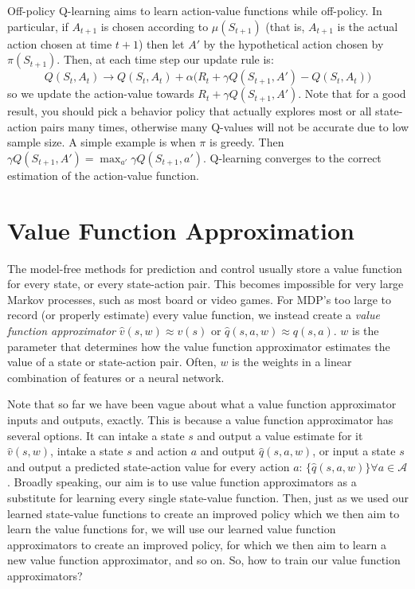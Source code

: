 \documentclass{article}
\newcommand{\ita}{\textit}
\begin{document}
Off-policy Q-learning aims to learn action-value functions while off-policy. In particular, if $A_{t+1}$ is chosen according to $\mu(S_{t+1})$ (that is, $A_{t+1}$ is the actual action chosen at time $t+1$) then let $A'$ by the hypothetical action chosen by $\pi(S_{t+1})$. Then, at each time step our update rule is:
$$Q(S_t, A_t) \rightarrow Q(S_t, A_t) + \alpha\bigg(R_t + \gamma Q(S_{t+1}, A') - Q(S_t, A_t)\bigg)$$
so we update the action-value towards $R_t + \gamma Q(S_{t+1}, A')$. Note that for a good result, you should pick a behavior policy that actually explores most or all state-action pairs many times, otherwise many Q-values will not be accurate due to low sample size. A simple example is when $\pi$ is greedy. Then $\gamma Q(S_{t+1}, A') = \max_{a'} \gamma Q(S_{t+1}, a')$. Q-learning converges to the correct estimation of the action-value function.

\section{Value Function Approximation}

The model-free methods for prediction and control usually store a value function for every state, or every state-action pair. This becomes impossible for very large Markov processes, such as most board or video games. For MDP's too large to record (or properly estimate) every value function, we instead create a \ita{value function approximator} $\hat{v}(s, w)\approx v(s)$ or $\hat{q}(s, a, w) \approx q(s, a)$. $w$ is the parameter that determines how the value function approximator estimates the value of a state or state-action pair. Often, $w$ is the weights in a linear combination of features or a neural network.

Note that so far we have been vague about what a value function approximator inputs and outputs, exactly. This is because a value function approximator has several options. It can intake a state $s$ and output a value estimate for it $\hat{v}(s, w)$, intake a state $s$ and action $a$ and output $\hat{q}(s, a, w)$, or input a state $s$ and output a predicted state-action value for every action $a$: $\big\{\hat{q}(s, a, w)\big\}\forall a\in\mathcal{A}$. Broadly speaking, our aim is to use value function approximators as a substitute for learning every single state-value function. Then, just as we used our learned state-value functions to create an improved policy which we then aim to learn the value functions for, we will use our learned value function approximators to create an improved policy, for which we then aim to learn a new value function approximator, and so on. So, how to train our value function approximators?
\end{document}
